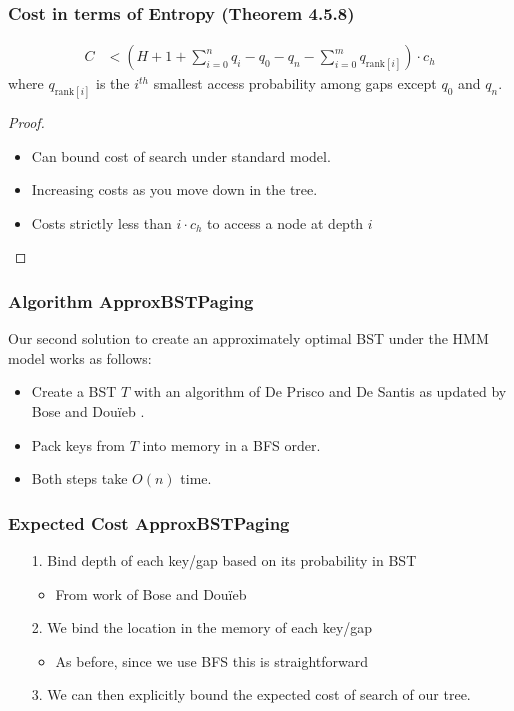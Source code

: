 \documentclass{beamer}
\theoremstyle{plain}
\begin{document}
\begin{frame}\frametitle{Cost in terms of Entropy (Theorem 4.5.8)}
\begin{align*}
C &< \left(H + 1 + \sum_{i=0}^n q_i - q_0 - q_n - \sum_{i=0}^m q_{\text{rank}[i]} \right) \cdot  c_h
\end{align*}
where $q_{\text{rank}[i]}$ is the $i^{th}$ smallest access probability among gaps except $q_0$ and $q_n$.
\begin{proof}
\begin{itemize}
\item Can bound cost of search under standard model.
\item Increasing costs as you move down in the tree.
\item Costs strictly less than $i \cdot c_h$ to access a node at depth $i$
\end{itemize}
\end{proof}
\end{frame}


\begin{frame} \frametitle{Algorithm ApproxBSTPaging}
Our second solution to create an approximately optimal BST under the HMM model works as follows: \\

\begin{itemize}
\item Create a BST $T$ with an algorithm of De Prisco and De Santis \cite{de1993binary} as updated by Bose and Dou\"{i}eb \cite{bose2009efficient}. \\

\item Pack keys from $T$ into memory in a BFS order.


\item Both steps take $O(n)$ time.
\end{itemize}

\end{frame}

\begin{frame} \frametitle{Expected Cost ApproxBSTPaging}\label{48}
\begin{itemize}
\item[1.] Bind depth of each key/gap based on its probability in BST
\begin{itemize}
\item From work of Bose and Dou\"{i}eb \cite{bose2009efficient}
\end{itemize}
\item[2.] We bind the location in the memory of each key/gap 
\begin{itemize}
\item As before, since we use BFS this is straightforward
\end{itemize}
\item[3.] We can then explicitly bound the expected cost of search of our tree.
\end{itemize}
\end{frame}
\end{document}
